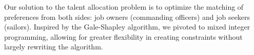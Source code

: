 Our solution to the talent allocation problem is to optimize the matching of preferences from both sides: job owners (commanding officers) and job seekers (sailors).  Inspired by the Gale-Shapley algorithm, we pivoted to mixed integer programming, allowing for greater flexibility in creating constraints without largely rewriting the algorithm. 